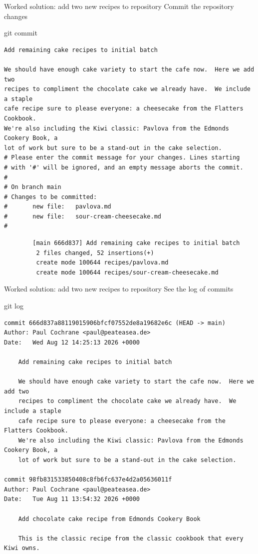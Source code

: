 \documentclass{git_course}
\begin{document}
\begin{frame}[fragile]{Worked solution: add two new recipes to repository}
    Commit the repository changes
    \begin{shellcode}
        git commit
    \end{shellcode}
    \begin{verbatim}
Add remaining cake recipes to initial batch

We should have enough cake variety to start the cafe now.  Here we add two
recipes to compliment the chocolate cake we already have.  We include a staple
cafe recipe sure to please everyone: a cheesecake from the Flatters Cookbook.
We're also including the Kiwi classic: Pavlova from the Edmonds Cookery Book, a
lot of work but sure to be a stand-out in the cake selection.
# Please enter the commit message for your changes. Lines starting
# with '#' will be ignored, and an empty message aborts the commit.
#
# On branch main
# Changes to be committed:
#       new file:   pavlova.md
#       new file:   sour-cream-cheesecake.md
#
    \end{verbatim}
    \begin{verbatim}
        [main 666d837] Add remaining cake recipes to initial batch
         2 files changed, 52 insertions(+)
         create mode 100644 recipes/pavlova.md
         create mode 100644 recipes/sour-cream-cheesecake.md
    \end{verbatim}
\end{frame}

\begin{frame}[fragile]{Worked solution: add two new recipes to repository}
    See the log of commits
    \begin{shellcode}
        git log
    \end{shellcode}
    \begin{verbatim}
commit 666d837a88119015906bfcf07552de8a19682e6c (HEAD -> main)
Author: Paul Cochrane <paul@peateasea.de>
Date:   Wed Aug 12 14:25:13 2026 +0000

    Add remaining cake recipes to initial batch

    We should have enough cake variety to start the cafe now.  Here we add two
    recipes to compliment the chocolate cake we already have.  We include a staple
    cafe recipe sure to please everyone: a cheesecake from the Flatters Cookbook.
    We're also including the Kiwi classic: Pavlova from the Edmonds Cookery Book, a
    lot of work but sure to be a stand-out in the cake selection.

commit 98fb831533850408c8fb6fc637e4d2a05636011f
Author: Paul Cochrane <paul@peateasea.de>
Date:   Tue Aug 11 13:54:32 2026 +0000

    Add chocolate cake recipe from Edmonds Cookery Book

    This is the classic recipe from the classic cookbook that every Kiwi owns.
    \end{verbatim}
\end{frame}
\end{document}
